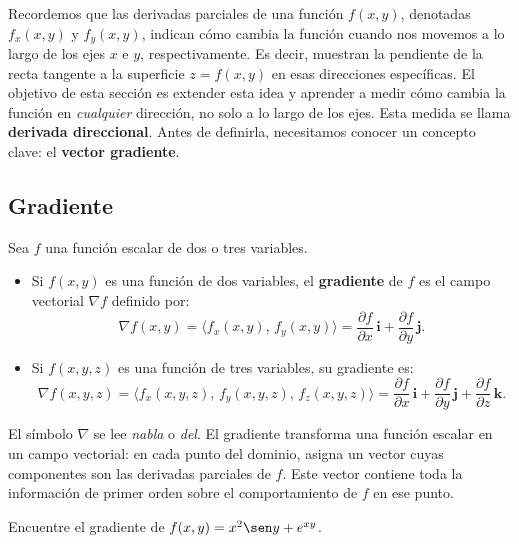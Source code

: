 Recordemos que las derivadas parciales de una función $f(x,y)$,
denotadas $f_x(x,y)$ y $f_y(x,y)$, indican cómo cambia la función
cuando nos movemos a lo largo de los ejes $x$ e $y$, respectivamente.
Es decir, muestran la pendiente de la recta tangente a la superficie
$z=f(x,y)$ en esas direcciones específicas. El objetivo de esta sección
es extender esta idea y aprender a medir cómo cambia la función en
\emph{cualquier} dirección, no solo a lo largo de los ejes. Esta medida
se llama \textbf{derivada direccional}. Antes de definirla,
necesitamos conocer un concepto clave: el \textbf{vector gradiente}.

\subsection{Gradiente}

\begin{definition}
Sea $f$ una función escalar de dos o tres variables.
\begin{itemize}
    \item Si $f(x,y)$ es una función de dos variables, el \textbf{gradiente}
    de $f$ es el campo vectorial $\nabla f$ definido por:
    \[
    \nabla f(x,y) = \langle f_x(x,y),\, f_y(x,y) \rangle
                  = \frac{\partial f}{\partial x}\,\mathbf{i}
                    + \frac{\partial f}{\partial y}\,\mathbf{j}.
    \]
    \item Si $f(x,y,z)$ es una función de tres variables, su gradiente es:
    \[
    \nabla f(x,y,z) = \langle f_x(x,y,z),\, f_y(x,y,z),\,
    f_z(x,y,z) \rangle
    = \frac{\partial f}{\partial x}\,\mathbf{i}
      + \frac{\partial f}{\partial y}\,\mathbf{j}
      + \frac{\partial f}{\partial z}\,\mathbf{k}.
    \]
\end{itemize}
\end{definition}

\begin{rem}
El símbolo $\nabla$ se lee \emph{nabla} o \emph{del}. El gradiente
transforma una función escalar en un campo vectorial: en cada punto del
dominio, asigna un vector cuyas componentes son las derivadas parciales
de $f$. Este vector contiene toda la información de primer orden sobre
el comportamiento de $f$ en ese punto.
\end{rem}

\begin{example}
Encuentre el gradiente de $f(x,y) = x^2 \sen y + e^{xy}$.
\end{example}

